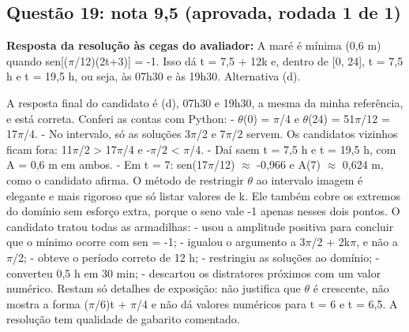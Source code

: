 \documentclass{article}%
\begin{document}
\subsection*{Questão 19: nota 9,5 (aprovada, rodada 1 de 1)}%
\textbf{Resposta da resolução às cegas do avaliador:} A maré é mínima (0,6 m) quando sen{[}($\pi$/12)(2t+3){]} = -1. Isso dá t = 7,5 + 12k e, dentro de {[}0, 24{]}, t = 7,5 h e t = 19,5 h, ou seja, às 07h30 e às 19h30. Alternativa (d).\par %
A resposta final do candidato é (d), 07h30 e 19h30, a mesma da minha referência, e está correta. Conferi as contas com Python:\newline%
{-} $\theta$(0) = $\pi$/4 e $\theta$(24) = 51$\pi$/12 = 17$\pi$/4.\newline%
{-} No intervalo, só as soluções 3$\pi$/2 e 7$\pi$/2 servem. Os candidatos vizinhos ficam fora: 11$\pi$/2 > 17$\pi$/4 e -$\pi$/2 < $\pi$/4.\newline%
{-} Daí saem t = 7,5 h e t = 19,5 h, com A = 0,6 m em ambos.\newline%
{-} Em t = 7: sen(17$\pi$/12) $\approx$ -0,966 e A(7) $\approx$ 0,624 m, como o candidato afirma.\newline%
\newline%
O método de restringir $\theta$ ao intervalo imagem é elegante e mais rigoroso que só listar valores de k. Ele também cobre os extremos do domínio sem esforço extra, porque o seno vale -1 apenas nesses dois pontos.\newline%
\newline%
O candidato tratou todas as armadilhas:\newline%
{-} usou a amplitude positiva para concluir que o mínimo ocorre com sen = -1;\newline%
{-} igualou o argumento a 3$\pi$/2 + 2k$\pi$, e não a $\pi$/2;\newline%
{-} obteve o período correto de 12 h;\newline%
{-} restringiu as soluções ao domínio;\newline%
{-} converteu 0,5 h em 30 min;\newline%
{-} descartou os distratores próximos com um valor numérico.\newline%
\newline%
Restam só detalhes de exposição: não justifica que $\theta$ é crescente, não mostra a forma ($\pi$/6)t + $\pi$/4 e não dá valores numéricos para t = 6 e t = 6,5. A resolução tem qualidade de gabarito comentado.%
\end{document}
